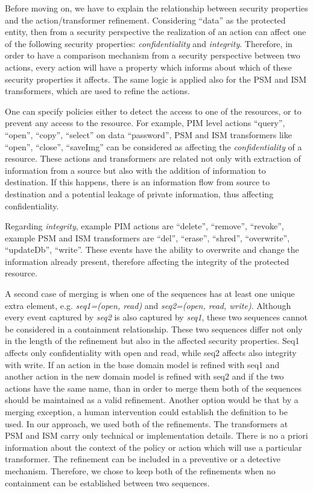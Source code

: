 \documentclass{sig-alternate}
\begin{document}
Before moving on, we have to explain the relationship between security properties and the action/transformer refinement.
Considering ``data'' as the protected entity, then from a security perspective the realization of an action 
can affect one of the following security properties: \textit{confidentiality} and \textit{integrity}.
Therefore, in order to have a comparison mechanism from a security perspective between two actions, 
every action will have a property which informs about which of these security properties it affects.
The same logic is applied also for the PSM and ISM transformers, which are used to refine the actions.

One can specify policies either to detect the access to one of the resources, or to prevent any access to the resource.
For example, PIM level actions ``query'', ``open'', ``copy'', ``select'' on data ``password'', PSM and ISM transformers like ``open'', ``close'', ``saveImg'' 
can be considered as affecting the \textit{confidentiality} of a resource. 
These actions and transformers are related not only with extraction of information from a source but also with the addition of information to destination.
If this happens, there is an information flow from source to destination and a potential leakage of private information, thus affecting confidentiality.

Regarding \textit{integrity}, example PIM actions are ``delete'', ``remove'', ``revoke'', 
example PSM and ISM transformers are ``del'', ``erase'', ``shred'', ``overwrite'', ``updateDb'', ``write''.
These events have the ability to overwrite and change the information already present, therefore affecting the integrity of the protected resource.

A second case of merging is when one of the sequences has at least one unique extra element,
e.g. \textit{seq1=(open, read)} and \textit{seq2=(open, read, write)}.
Although every event captured by \textit{seq2} is also captured by \textit{seq1}, these two sequences cannot be considered in a containment relationship.
These two sequences differ not only in the length of the refinement but also in the affected security properties.
Seq1 affects only confidentiality with open and read, while seq2 affects also integrity with write.
If an action in the base domain model is refined with seq1 and another action in the new domain model is refined with seq2 
and if the two actions have the same name, than in order to merge them both of the sequences should be maintained as a valid refinement.
Another option would be that by a merging exception, a human intervention could establish the definition to be used.
In our approach, we used both of the refinements. 
The transformers at PSM and ISM carry only technical or implementation details.
There is no a priori information about the context of the policy or action which will use a particular transformer.
The refinement can be included in a preventive or a detective mechanism.
Therefore, we chose to keep both of the refinements when no containment can be established between two sequences.
\end{document}
